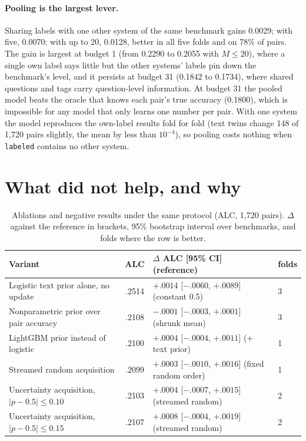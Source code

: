 \documentclass{article}
\newcommand{\code}[1]{\texttt{#1}}
\newcommand{\labeled}{\code{labeled}}
\begin{document}
\paragraph{Pooling is the largest lever.} Sharing labels with one other system of the same benchmark gains 0.0029; with five, 0.0070; with up to 20, 0.0128, better in all five folds and on 78\% of pairs. The gain is largest at budget 1 (from 0.2290 to 0.2055 with $M\le 20$), where a single own label says little but the other systems' labels pin down the benchmark's level, and it persists at budget 31 (0.1842 to 0.1734), where shared questions and tags carry question-level information. At budget 31 the pooled model beats the oracle that knows each pair's true accuracy (0.1800), which is impossible for any model that only learns one number per pair. With one system the model reproduces the own-label results fold for fold (text twins change 148 of 1{,}720 pairs slightly, the mean by less than $10^{-4}$), so pooling costs nothing when \labeled{} contains no other system.

\section{What did not help, and why}
\label{sec:negative}

\begin{table}[t]
  \caption{Ablations and negative results under the same protocol (ALC, 1{,}720 pairs). $\Delta$ against the reference in brackets, 95\% bootstrap interval over benchmarks, and folds where the row is better.}
  \label{tab:negative}
  \centering
  \footnotesize
  \begin{tabular}{@{}lcll@{}}
    \toprule
    Variant & ALC & $\Delta$ ALC [95\% CI] (reference) & folds \\
    \midrule
    Logistic text prior alone, no update & .2514 & $+.0014$ [$-.0060$, $+.0089$] (constant 0.5) & 3 \\
    Nonparametric prior over pair accuracy & .2108 & $-.0001$ [$-.0003$, $+.0001$] (shrunk mean) & 3 \\
    LightGBM prior instead of logistic & .2100 & $+.0004$ [$-.0004$, $+.0011$] (+ text prior) & 1 \\
    Streamed random acquisition & .2099 & $+.0003$ [$-.0010$, $+.0016$] (fixed random order) & 1 \\
    Uncertainty acquisition, $|p-0.5| \le 0.10$ & .2103 & $+.0004$ [$-.0007$, $+.0015$] (streamed random) & 2 \\
    Uncertainty acquisition, $|p-0.5| \le 0.15$ & .2107 & $+.0008$ [$-.0004$, $+.0019$] (streamed random) & 2 \\
    \bottomrule
  \end{tabular}
\end{table}
\end{document}
